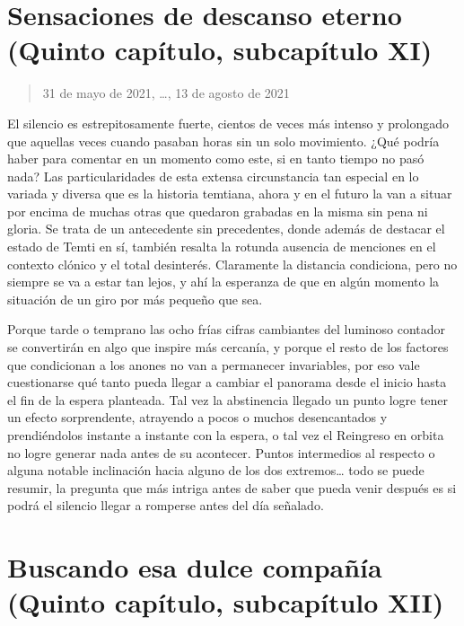 \documentclass[
  spanish,
]{book}
\begin{document}
\hypertarget{sensaciones-de-descanso-eterno-quinto-capuxedtulo-subcapuxedtulo-xi}{%
\section{Sensaciones de descanso eterno (Quinto capítulo, subcapítulo XI)}\label{sensaciones-de-descanso-eterno-quinto-capuxedtulo-subcapuxedtulo-xi}}

\begin{quote}
31 de mayo de 2021, \ldots, 13 de agosto de 2021
\end{quote}

El silencio es estrepitosamente fuerte, cientos de veces más intenso y prolongado que aquellas veces cuando pasaban horas sin un solo movimiento. ¿Qué podría haber para comentar en un momento como este, si en tanto tiempo no pasó nada?
Las particularidades de esta extensa circunstancia tan especial en lo variada y diversa que es la historia temtiana, ahora y en el futuro la van a situar por encima de muchas otras que quedaron grabadas en la misma sin pena ni gloria. Se trata de un antecedente sin precedentes, donde además de destacar el estado de Temti en sí, también resalta la rotunda ausencia de menciones en el contexto clónico y el total desinterés. Claramente la distancia condiciona, pero no siempre se va a estar tan lejos, y ahí la esperanza de que en algún momento la situación de un giro por más pequeño que sea.

Porque tarde o temprano las ocho frías cifras cambiantes del luminoso contador se convertirán en algo que inspire más cercanía, y porque el resto de los factores que condicionan a los anones no van a permanecer invariables, por eso vale cuestionarse qué tanto pueda llegar a cambiar el panorama desde el inicio hasta el fin de la espera planteada.
Tal vez la abstinencia llegado un punto logre tener un efecto sorprendente, atrayendo a pocos o muchos desencantados y prendiéndolos instante a instante con la espera, o tal vez el Reingreso en orbita no logre generar nada antes de su acontecer.
Puntos intermedios al respecto o alguna notable inclinación hacia alguno de los dos extremos\ldots{} todo se puede resumir, la pregunta que más intriga antes de saber que pueda venir después es si podrá el silencio llegar a romperse antes del día señalado.

\hypertarget{buscando-esa-dulce-compauxf1uxeda-quinto-capuxedtulo-subcapuxedtulo-xii}{%
\section{Buscando esa dulce compañía (Quinto capítulo, subcapítulo XII)}\label{buscando-esa-dulce-compauxf1uxeda-quinto-capuxedtulo-subcapuxedtulo-xii}}
\end{document}
